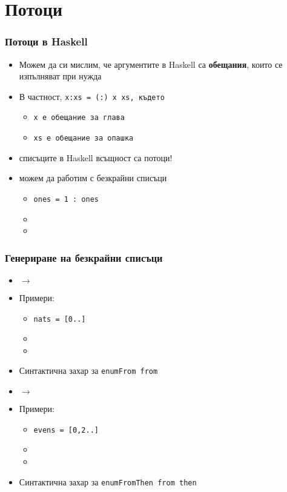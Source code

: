 \documentclass{beamer}
\begin{document}
\section{Потоци}

\begin{frame}
  \frametitle{Потоци в Haskell}
  \begin{itemize}[<+->]
  \item Можем да си мислим, че аргументите в Haskell са \textbf{обещания}, които се изпълняват при нужда
  \item В частност, \tt{x:xs = (:) x xs}, където
    \begin{itemize}
    \item \tt x е обещание за глава
    \item \tt{xs} е обещание за опашка
    \end{itemize}
  \item \alert{списъците в Haskell всъщност са потоци!}
  \item можем да работим с безкрайни списъци
    \begin{itemize}
    \item \tt{ones = 1 : ones}
    \item {}
    \item {}
    \end{itemize}
  \end{itemize}
\end{frame}

\begin{frame}
  \frametitle{Генериране на безкрайни списъци}
  \begin{itemize}
  \item {} $\rightarrow$ 
  \item Примери:
    \begin{itemize}
    \item \tt{nats = [0..]}
    \item {}
    \item {}
    \end{itemize}
  \item Синтактична захар за \tt{enumFrom from}
    \pause
  \item {} $\rightarrow$ 
  \item Примери:
    \begin{itemize}
    \item \tt{evens = [0,2..]}
    \item {}
    \item {}
    \end{itemize}
  \item Синтактична захар за \tt{enumFromThen from then}
  \end{itemize}
\end{frame}
\end{document}
